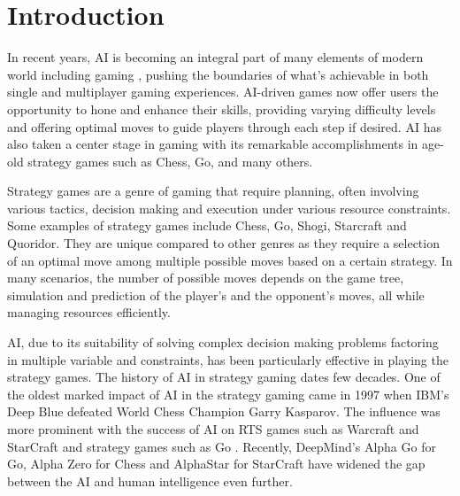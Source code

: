\chapter{Introduction}

In recent years, \gls{AI} is becoming an integral part of many elements of modern world including gaming \citep{Skinner2010Artificial}, pushing the boundaries of what's achievable in both single and multiplayer gaming experiences. \gls{AI}-driven games now offer users the opportunity to hone and enhance their skills, providing varying difficulty levels and offering optimal moves to guide players through each step if desired. \gls{AI} has also taken a center stage in gaming with its remarkable accomplishments in age-old strategy games such as Chess, Go, and many others. 

% 

Strategy games are a genre of gaming that require planning, often involving various tactics, decision making and execution under various resource constraints. Some examples of strategy games include Chess, Go, Shogi, Starcraft and Quoridor. They are unique compared to other genres as they require a selection of an optimal move among multiple possible moves based on a certain strategy. In many scenarios, the number of possible moves depends on the game tree, simulation and prediction of the player's and the opponent's moves, all while managing resources efficiently.

\gls{AI}, due to its suitability of solving complex decision making problems factoring in multiple variable and constraints, has been particularly effective in playing the strategy games. The history of \gls{AI} in strategy gaming dates few decades. One of the oldest marked impact of \gls{AI} in the strategy gaming came in 1997 when IBM's Deep Blue \citep{Campbell2002Deep} defeated World Chess Champion Garry Kasparov. The influence was more prominent with the success of \gls{AI} on \gls{RTS} games such as Warcraft and StarCraft \citep{Robertson2014Review} and strategy games such as Go \citep{Huang2011Monte}. Recently, DeepMind's Alpha Go for Go, Alpha Zero for Chess \citep{Silver2017Mastering} and AlphaStar for StarCraft \citep{Team2019Alphastar} have widened the gap between the \gls{AI} and human intelligence even further.

